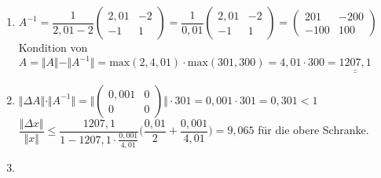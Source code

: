 \documentclass[a4paper,10pt]{article}
\begin{document}
\begin{enumerate}[a)]
		\begin{enumerate}[b1)]
			\item 
			$A^{-1} = \dfrac{1}{2,01 - 2}
			\begin{pmatrix}
			2,01 & -2\\
			-1 & 1
			\end{pmatrix}
			= \dfrac{1}{0,01}
			\begin{pmatrix}
			2,01 & -2\\
			-1 & 1
			\end{pmatrix}
			=
			\begin{pmatrix}
			201 & -200\\
			-100 & 100
			\end{pmatrix}
			$\\
			
			Kondition von $A = \Vert A \Vert - \Vert A^{-1} \Vert = \mathrm{max}(2, 4,01) \cdot \mathrm{max}(301, 300) = 4,01 \cdot 300 = \underline{\underline{1207,1}}$
			\item
			$\Vert \varDelta A \Vert \cdot \Vert A^{-1} \Vert = \Big \Vert
			\begin{pmatrix}
			0,001 & 0\\
			0 & 0
			\end{pmatrix}
			\Big \Vert  \cdot 301 = 0,001 \cdot 301 = 0,301 < 1$\\
			
			$\dfrac{\Vert \varDelta x \Vert}{\Vert x \Vert} \leq \dfrac{1207,1}{1 - 1207,1 \cdot \frac{0,001}{4,01}} \Big (\dfrac{0,01}{2} + \dfrac{0,001}{4,01} \Bigg) = 9,065$ für die obere Schranke.
			\item \ \\
			

\end{enumerate}
\end{enumerate}
\end{document}
